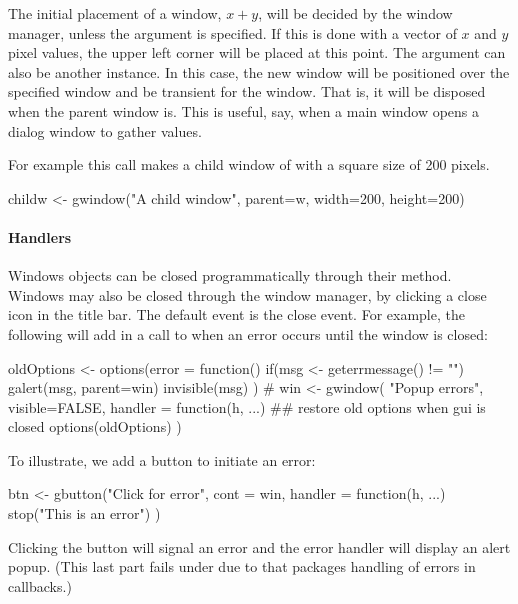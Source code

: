 The initial placement of a window, $x+y$, will be decided by the
window manager, unless the  argument is
specified. If this is done with a vector of $x$ and $y$ pixel values,
the upper left corner will be placed at this point. The 
argument can also be another  instance. In this case,
the new window will be positioned over the specified window and be
transient for the window. That is, it will be disposed when the parent
window is. This is useful, say, when a main window opens a dialog
window to gather values.

For example this call makes a child window of  with a square
size of 200 pixels.
\begin{Schunk}
\begin{Sinput}
 childw <- gwindow("A child window", parent=w, 
                   width=200, height=200)
\end{Sinput}
\end{Schunk}


\paragraph{Handlers}
Windows objects can be closed programmatically through their
 method. Windows may also be closed through
the window manager, by clicking a close icon in the title bar. The
default event is the close event. For example, the following will add
in a call to  when an error occurs until the window is closed:

\begin{Schunk}
\begin{Sinput}
 oldOptions <- options(error = function() {
   if(msg <- geterrmessage() != "")
     galert(msg, parent=win)
   invisible(msg)
 })
 #
 win <- gwindow( "Popup errors", visible=FALSE,
                handler = function(h, ...) {
                  ## restore old options when gui is closed
                  options(oldOptions)       
                })
\end{Sinput}
\end{Schunk}

To illustrate, we add a button to initiate an error:
\begin{Schunk}
\begin{Sinput}
 btn <- gbutton("Click for error",  cont = win,
                handler = function(h, ...) {
                  stop("This is an error")
                })
\end{Sinput}
\end{Schunk}
%
Clicking the button will signal an error and the error handler will
display an alert popup. (This last part fails under  due to
that packages handling of errors in callbacks.)


